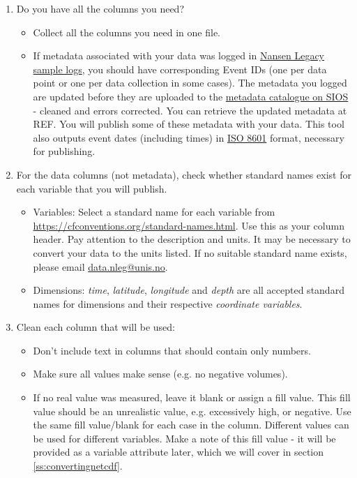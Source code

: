 \documentclass[a4paper,english, 11pt]{article}
\makeatletter
\newcommand{\emailme}{\href{mailto:data.nleg@unis.no}{data.nleg@unis.no}}
\makeatother
\begin{document}
\begin{enumerate}
\item Do you have all the columns you need?
\begin{itemize}
\item Collect all the columns you need in one file.
\item If metadata associated with your data was logged in \href{https://sios-svalbard.org/cgi-bin/darwinsheet/?setup=aen}{Nansen Legacy sample logs}, you should have corresponding Event IDs (one per data point or one per data collection in some cases). The metadata you logged are updated before they are uploaded to the \href{https://sios-svalbard.org/aen/tools}{metadata catalogue on SIOS} - cleaned and errors corrected. You can retrieve the updated metadata at REF. You will publish some of these metadata with your data. This tool also outputs event dates (including times) in \href{https://en.wikipedia.org/wiki/ISO_8601}{ISO 8601} format, necessary for publishing.    
\end{itemize}
\item For the data columns (not metadata), check whether standard names exist for each variable that you will publish.
\begin{itemize}
\item Variables:
Select a standard name for each variable from \href{https://cfconventions.org/standard-names.html}{https://cfconventions.org/standard-names.html}. Use this as your column header. Pay attention to the description and units. It may be necessary to convert your data to the units listed. If no suitable standard name exists, please email \emailme .
\item Dimensions: \textit{time}, \textit{latitude}, \textit{longitude} and \textit{depth} are all accepted standard names for dimensions and their respective \textit{coordinate variables}.
\end{itemize}
\item Clean each column that will be used:
\begin{itemize}
\item Don't include text in columns that should contain only numbers.
\item Make sure all values make sense (e.g. no negative volumes).
\item If no real value was measured, leave it blank or assign a fill value. This fill value should be an unrealistic value, e.g. excessively high, or negative. Use the same fill value/blank for each case in the column. Different values can be used for different variables. Make a note of this fill value - it will be provided as a variable attribute later, which we will cover in section \ref{ss:convertingnetcdf}.
\end{itemize}
\end{enumerate}
\end{document}
